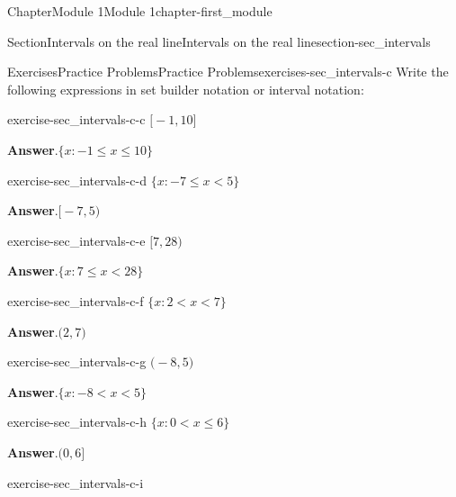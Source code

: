 \documentclass[oneside,10pt,]{book}
\newcommand{\blocktitlefont}{\relax}
\newcommand{\lt}{<}
\begin{document}
\begin{chapterptx}{Chapter}{Module 1}{}{Module 1}{}{}{chapter-first_module}
\begin{sectionptx}{Section}{Intervals on the real line}{}{Intervals on the real line}{}{}{section-sec_intervals}
%
%
\typeout{************************************************}
\typeout{************************************************}
%
\begin{exercises-subsection-numberless}{Exercises}{Practice Problems}{}{Practice Problems}{}{}{exercises-sec_intervals-c}
Write the following expressions in set builder notation or interval notation:%
\begin{divisionexercise}{1}{}{}{exercise-sec_intervals-c-c}%
\(\big[ -1, 10 \big]\)\par\smallskip%
\noindent\textbf{\blocktitlefont Answer}.\hypertarget{answer-sec_intervals-c-c-b}{}\quad{}\(\{ x : -1 \leq x \leq 10 \}\)\end{divisionexercise}%
\begin{divisionexercise}{2}{}{}{exercise-sec_intervals-c-d}%
\(\{ x : -7 \leq x < 5 \}\)\par\smallskip%
\noindent\textbf{\blocktitlefont Answer}.\hypertarget{answer-sec_intervals-c-d-b}{}\quad{}\(\big[ -7, 5 \big)\)\end{divisionexercise}%
\begin{divisionexercise}{3}{}{}{exercise-sec_intervals-c-e}%
\(\big[ 7, 28 \big)\)\par\smallskip%
\noindent\textbf{\blocktitlefont Answer}.\hypertarget{answer-sec_intervals-c-e-b}{}\quad{}\(\{ x : 7 \leq x \lt 28 \}\)\end{divisionexercise}%
\begin{divisionexercise}{4}{}{}{exercise-sec_intervals-c-f}%
\(\{ x : 2 \lt x \lt 7 \}\)\par\smallskip%
\noindent\textbf{\blocktitlefont Answer}.\hypertarget{answer-sec_intervals-c-f-b}{}\quad{}\(\big( 2, 7 \big)\)\end{divisionexercise}%
\begin{divisionexercise}{5}{}{}{exercise-sec_intervals-c-g}%
\(\big( -8, 5 \big)\)\par\smallskip%
\noindent\textbf{\blocktitlefont Answer}.\hypertarget{answer-sec_intervals-c-g-b}{}\quad{}\(\{ x : -8 \lt x \lt 5 \}\)\end{divisionexercise}%
\begin{divisionexercise}{6}{}{}{exercise-sec_intervals-c-h}%
\(\{ x : 0 \lt x \leq 6 \}\)\par\smallskip%
\noindent\textbf{\blocktitlefont Answer}.\hypertarget{answer-sec_intervals-c-h-b}{}\quad{}\(\big( 0, 6 \big]\)\end{divisionexercise}%
\begin{divisionexercise}{7}{}{}{exercise-sec_intervals-c-i}%

\end{divisionexercise}
\end{exercises-subsection-numberless}
\end{sectionptx}
\end{chapterptx}
\end{document}
